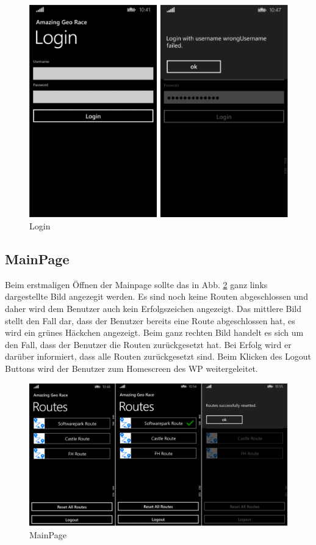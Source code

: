 \documentclass[a4paper,ngerman]{scrartcl}
\begin{document}
\begin{figure}[h]
	\centering
	\includegraphics[width=.95\textwidth]{images/loginPage_Stati}
	\caption{Login}
	\label{fig:ScreenLogin}
\end{figure}

\newpage
\subsection{MainPage}
Beim erstmaligen Öffnen der Mainpage sollte das in  Abb. \ref{fig:ScreenMain} ganz links dargestellte Bild angezegit werden. Es sind noch keine Routen abgeschlossen und daher wird dem Benutzer auch kein Erfolgszeichen angezeigt. Das mittlere Bild stellt den Fall dar, dass der Benutzer bereits eine Route abgeschlossen hat, es wird ein grünes Häckchen angezeigt. Beim ganz rechten Bild handelt es sich um den Fall, dass der Benutzer die Routen zurückgesetzt hat. Bei Erfolg wird er darüber informiert, dass alle Routen zurückgesetzt sind. Beim Klicken des Logout Buttons wird der Benutzer zum Homescreen des WP weitergeleitet.
\begin{figure}[h]
	\centering
	\includegraphics[width=.95\textwidth]{images/routePage_Stati}
	\caption{MainPage}
	\label{fig:ScreenMain}
\end{figure}
\end{document}
